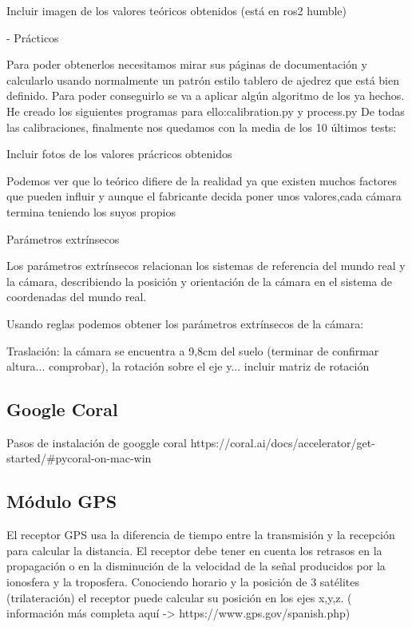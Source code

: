 Incluir imagen de los valores teóricos obtenidos (está en ros2 humble)




- Prácticos 

Para poder obtenerlos necesitamos mirar sus páginas de documentación y calcularlo usando normalmente un patrón estilo tablero de ajedrez que está bien definido. Para poder conseguirlo se va a aplicar algún algoritmo de los ya hechos. He creado los siguientes programas para ello:calibration.py y process.py De todas las calibraciones, finalmente nos quedamos con la media de los 10 últimos tests:

Incluir fotos de los valores prácricos obtenidos



Podemos ver que lo teórico difiere de la realidad ya que existen muchos factores que pueden influir y aunque el fabricante decida poner unos valores,cada cámara termina teniendo los suyos propios


Parámetros extrínsecos

Los parámetros extrínsecos relacionan los sistemas de referencia del mundo real y la cámara, describiendo la posición y orientación de la cámara en el sistema de coordenadas del mundo real.

Usando reglas podemos obtener los parámetros extrínsecos de la cámara:

Traslación: la cámara se encuentra a 9,8cm del suelo (terminar de confirmar altura... comprobar), la rotación sobre el eje y... incluir matriz de rotación
 


\subsection{Google Coral}
\label{subsec:configgcoral}


Pasos de instalación de googgle coral
https://coral.ai/docs/accelerator/get-started/\#pycoral-on-mac-win

\subsection{Módulo GPS}
\label{subsec:configgps}

El receptor GPS usa la diferencia de tiempo entre la transmisión y la recepción para calcular la distancia. El receptor debe tener en cuenta los retrasos en la propagación o en la disminución de la velocidad de la señal producidos por la ionosfera y la troposfera. Conociendo horario y la posición de 3 satélites (trilateración) el receptor puede calcular su posición en los ejes x,y,z. ( información más completa aquí -> https://www.gps.gov/spanish.php)

